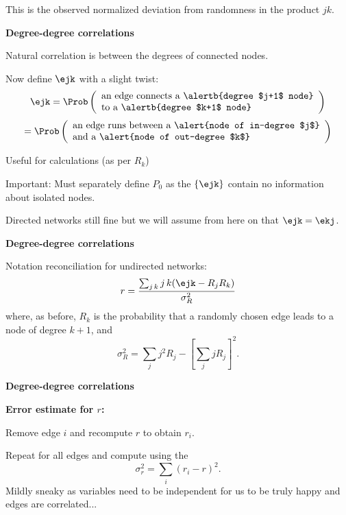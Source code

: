      This is the observed normalized deviation from randomness
      in the product $jk$.
    


  \textbf{Degree-degree correlations}
  
  
  
    Natural correlation is between the degrees
    of connected nodes.
  
    Now define $\ejk$ with a slight twist:
    $$
    \ejk
      = \Prob 
      \left(
        \begin{array}{ll}
          \mbox{an edge connects a \alertb{degree $j+1$ node}} \\ 
          \mbox{to a \alertb{degree $k+1$ node}}
        \end{array}
      \right)
    $$
    {
      $$
      = \Prob 
      \left(
        \begin{array}{ll}
          \mbox{an edge runs between a \alert{node of in-degree $j$}}\\
          \mbox{and a \alert{node of out-degree $k$}}
        \end{array}
      \right)
      $$
    }
  
    Useful for calculations (as per $R_k$)
  
    \alert{Important:} Must separately define $P_0$
    as the $\{\ejk\}$ contain no information about
    isolated nodes.
  
    Directed networks still fine but we will assume
    from here on that $\ejk = \ekj$.
  


  \textbf{Degree-degree correlations}

  
  
    Notation reconciliation for undirected networks:
    $$
    r = 
    \frac{\sum_{j\, k} j\, k (\ejk - R_j R_k)}
    {\sigma_R^2}
    $$
    where, as before, $R_k$ is the probability that a 
    randomly chosen edge leads to a node of degree $k+1$,
    and
    $$
    \sigma_R^2 = 
    \sum_j j^2 R_j - 
    \left[
      \sum_j j R_j
    \right]^2.
    $$
  


  \textbf{Degree-degree correlations}
  
  \textbf{Error estimate for $r$:}
    
    
      Remove edge $i$ and recompute $r$ 
      to obtain $r_i$.
    
      Repeat for all edges and compute
      using the 
      \cite{efron1981a}
      $$
      \sigma_r^2 
      =
      \sum_{i} (r_i - r)^2.
      $$
     Mildly sneaky as variables need to be
      independent for us to be truly happy and edges
      are correlated...
    
